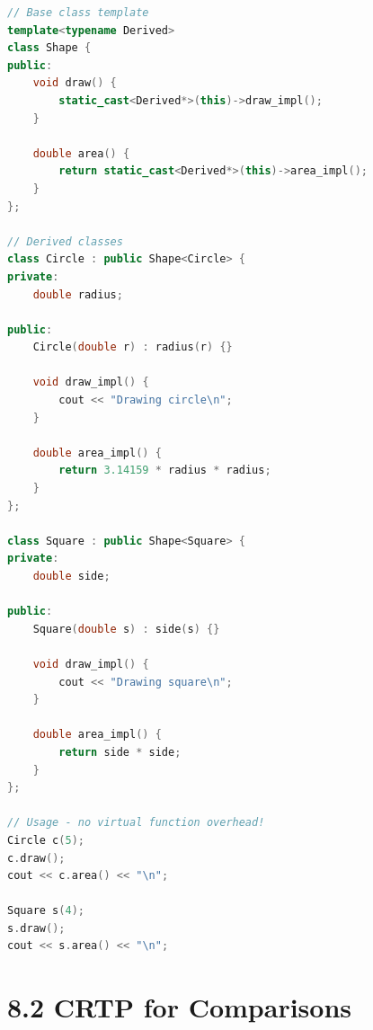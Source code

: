 \begin{lstlisting}[language={C++}]
// Base class template
template<typename Derived>
class Shape {
public:
    void draw() {
        static_cast<Derived*>(this)->draw_impl();
    }
    
    double area() {
        return static_cast<Derived*>(this)->area_impl();
    }
};

// Derived classes
class Circle : public Shape<Circle> {
private:
    double radius;
    
public:
    Circle(double r) : radius(r) {}
    
    void draw_impl() {
        cout << "Drawing circle\n";
    }
    
    double area_impl() {
        return 3.14159 * radius * radius;
    }
};

class Square : public Shape<Square> {
private:
    double side;
    
public:
    Square(double s) : side(s) {}
    
    void draw_impl() {
        cout << "Drawing square\n";
    }
    
    double area_impl() {
        return side * side;
    }
};

// Usage - no virtual function overhead!
Circle c(5);
c.draw();
cout << c.area() << "\n";

Square s(4);
s.draw();
cout << s.area() << "\n";
\end{lstlisting}

\hypertarget{crtp-for-comparisons}{%
\section{8.2 CRTP for Comparisons}\label{crtp-for-comparisons}}

